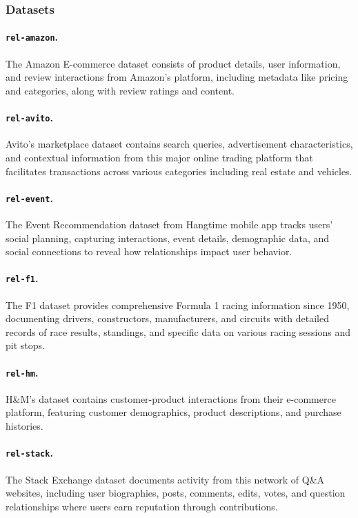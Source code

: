 \documentclass{article} %
\begin{document}
\subsubsection{Datasets}


\paragraph{\texttt{rel-amazon}.} The Amazon E-commerce dataset consists of product details, user information, and review interactions from Amazon's platform, including metadata like pricing and categories, along with review ratings and content.

\paragraph{\texttt{rel-avito}.} Avito's marketplace dataset contains search queries, advertisement characteristics, and contextual information from this major online trading platform that facilitates transactions across various categories including real estate and vehicles.

\paragraph{\texttt{rel-event}.} The Event Recommendation dataset from Hangtime mobile app tracks users' social planning, capturing interactions, event details, demographic data, and social connections to reveal how relationships impact user behavior.

\paragraph{\texttt{rel-f1}.} The F1 dataset provides comprehensive Formula 1 racing information since 1950, documenting drivers, constructors, manufacturers, and circuits with detailed records of race results, standings, and specific data on various racing sessions and pit stops.

\paragraph{\texttt{rel-hm}.} H\&M's dataset contains customer-product interactions from their e-commerce platform, featuring customer demographics, product descriptions, and purchase histories.

\paragraph{\texttt{rel-stack}.} The Stack Exchange dataset documents activity from this network of Q\&A websites, including user biographies, posts, comments, edits, votes, and question relationships where users earn reputation through contributions.
\end{document}
